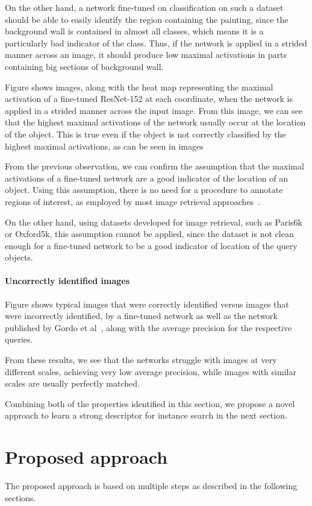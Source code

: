 On the other hand, a network fine-tuned on classification on such a dataset
should be able to easily identify the region containing the painting, since
the background wall is contained in almost all classes, which means it is a
particularly bad indicator of the class. Thus, if the network is applied in
a strided manner across an image, it should produce low maximal activations
in parts containing big sections of background wall.

Figure %
shows images, along with the heat map representing the maximal activation of
a fine-tuned ResNet-152 at each coordinate,
when the network is applied in a strided manner
across the input image. From this image, we can see that the highest maximal
activations of the network usually occur at the location of the object.
This is true even if the object is not correctly classified by the highest
maximal activations, as can be seen in images %

From the previous observation, we can confirm the assumption that the
maximal activations of a fine-tuned network are a good indicator of
the location of an object. Using this assumption, there is no need
for a procedure to annotate regions of interest, as employed by most
image retrieval approaches~\cite{}. %

On the other hand, using datasets developed for image retrieval,
such as Paris6k or Oxford5k, %
this assumption cannot be applied, since the dataset is not clean
enough for a fine-tuned network to be a good indicator of location of
the query objects.

\paragraph{Uncorrectly identified images}
Figure %
shows typical images that were correctly identified versus images that
were incorrectly identified, by a fine-tuned network as well as the network
published by Gordo et al~\cite{}, along with the average precision for
the respective queries.

From these results, we see that the networks struggle with images at
very different scales, achieving very low average precision,
while images with similar scales are usually perfectly matched.

Combining both of the properties identified in this section, we
propose a novel approach to learn a strong descriptor for instance
search in the next section.

\section{Proposed approach}
The proposed approach is based on multiple steps as described in the
following sections.

